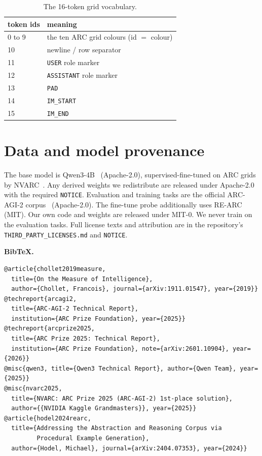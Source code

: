 \documentclass[11pt]{article}
\begin{document}
\begin{table}[H]
\centering
\caption{The 16-token grid vocabulary.}
\label{tab:vocab}
\begin{tabular}{ll}
\toprule
token ids & meaning \\
\midrule
0 to 9 & the ten ARC grid colours (id $=$ colour) \\
10   & newline / row separator \\
11   & \texttt{USER} role marker \\
12   & \texttt{ASSISTANT} role marker \\
13   & \texttt{PAD} \\
14   & \texttt{IM\_START} \\
15   & \texttt{IM\_END} \\
\bottomrule
\end{tabular}
\end{table}

\section{Data and model provenance}
\label{app:prov}
The base model is Qwen3-4B~\cite{qwen3} (Apache-2.0), supervised-fine-tuned on ARC grids by
NVARC~\cite{nvarc}. Any derived weights we redistribute are released under Apache-2.0 with the
required \texttt{NOTICE}. Evaluation and training tasks are the official ARC-AGI-2 corpus~\cite{arcagi2}
(Apache-2.0). The fine-tune probe additionally uses RE-ARC~\cite{rearc} (MIT). Our own code and
weights are released under MIT-0. We never train on the evaluation tasks. Full license texts and
attribution are in the repository's \texttt{THIRD\_PARTY\_LICENSES.md} and \texttt{NOTICE}.

\medskip
\noindent\textbf{BibTeX.}
{\footnotesize
\begin{verbatim}
@article{chollet2019measure,
  title={On the Measure of Intelligence},
  author={Chollet, Francois}, journal={arXiv:1911.01547}, year={2019}}
@techreport{arcagi2,
  title={ARC-AGI-2 Technical Report},
  institution={ARC Prize Foundation}, year={2025}}
@techreport{arcprize2025,
  title={ARC Prize 2025: Technical Report},
  institution={ARC Prize Foundation}, note={arXiv:2601.10904}, year={2026}}
@misc{qwen3, title={Qwen3 Technical Report}, author={Qwen Team}, year={2025}}
@misc{nvarc2025,
  title={NVARC: ARC Prize 2025 (ARC-AGI-2) 1st-place solution},
  author={{NVIDIA Kaggle Grandmasters}}, year={2025}}
@article{hodel2024rearc,
  title={Addressing the Abstraction and Reasoning Corpus via
         Procedural Example Generation},
  author={Hodel, Michael}, journal={arXiv:2404.07353}, year={2024}}
\end{verbatim}
}
\end{document}
